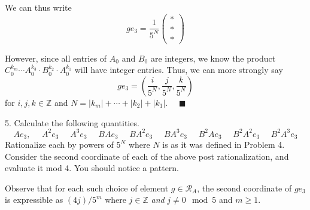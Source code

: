 \documentclass[12pt]{article}
\newcommand{\Z}{\mathbb{Z}}
\newcommand{\abs}[1]{\left\vert #1 \right\vert}
\newcommand{\qed}{\quad \blacksquare}
\begin{document}
        We can thus write 
        \[ge_3 = \frac{1}{5^N} \begin{pmatrix}
            *\\*\\*
        \end{pmatrix}\]

        However, since all entries of $A_0$ and $B_0$ are integers, we know the product $C_0^{k_m}\cdots A_0^{k_3} \cdot B_0^{k_2} \cdot A_0^{k_1}$ will have integer entries. Thus, we can more strongly say 
        \[ge_3 = \left(\frac{i}{5^N}, \frac{j}{5^N}, \frac{k}{5^N}\right)\]
        for $i, j, k \in \Z$ and $N = \abs{k_m} + \cdots + \abs{k_2} + \abs{k_1}$. $\qed$
    \color{black}


\pagebreak 

5.  Calculate the following quantities.  
\[Ae_{3},\phantom{=} A^{2}e_{3} \phantom{=} A^{3}e_{3} \phantom{=} BAe_{3} \phantom{=} BA^{2}e_{3} \phantom{=} BA^{3}e_{3} \phantom{=} B^{2}Ae_{3} \phantom{=} B^{2}A^{2}e_{3} \phantom{=}B^{2}A^{3}e_{3}\]
Rationalize each by powers of $5^{N}$ where $N$ is as it was defined in Problem 4.  Consider the second coordinate of each of the above post rationalization, and evaluate it mod 4.  You should notice a pattern.  

Observe that for each such choice of element $g \in \mathcal{R}_{A}$, the second coordinate of $ge_{3}$ is expressible as $(4j)/5^{m}$ where $j \in \mathbb{Z}$ \emph{ and } $j \neq 0 \mod 5$ and $m \geq 1$. 
\end{document}
